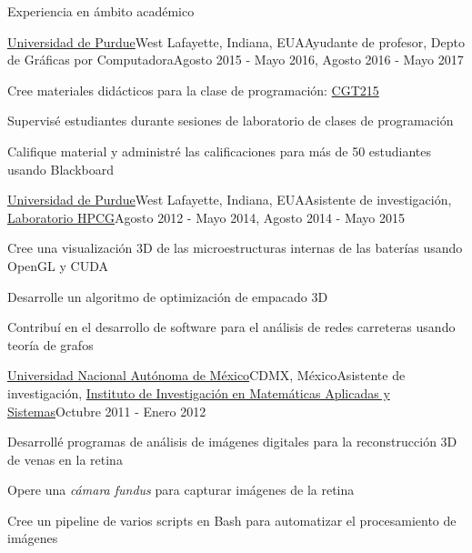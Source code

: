 \documentclass{resume} %
\begin{document}
\begin{rSection}{Experiencia en ámbito académico}

	\begin{rSubsection}{\href{http://www.purdue.edu}{Universidad de Purdue}}{West Lafayette, Indiana, EUA}{Ayudante de profesor, Depto de Gráficas por Computadora}{Agosto 2015 - Mayo 2016, Agosto 2016 - Mayo 2017}
	\item Cree materiales didácticos para la clase de programación: \href{https://polytechnic.purdue.edu/sites/default/files/CGT-fall-2017.pdf}{CGT215}
	\item Supervisé estudiantes durante sesiones de laboratorio de clases de programación
	\item Califique material y administré las calificaciones para más de 50 estudiantes usando Blackboard
	\end{rSubsection}

	\begin{rSubsection}{\href{http://www.purdue.edu}{Universidad de Purdue}}{West Lafayette, Indiana, EUA}{Asistente de investigación, \href{http://hpcg.purdue.edu/}{Laboratorio HPCG}}{Agosto 2012 - Mayo 2014, Agosto 2014 - Mayo 2015}
	\item Cree una visualización 3D de las microestructuras internas de las baterías usando OpenGL y CUDA
	\item Desarrolle un algoritmo de optimización de empacado 3D
	\item Contribuí en el desarrollo de software para el análisis de redes carreteras usando teoría de grafos
	\end{rSubsection}
	
	\begin{rSubsection}{\href{http://www.unam.mx}{Universidad Nacional Autónoma de México}}{CDMX, México}{Asistente de investigación, \href{https://turing.iimas.unam.mx/}{Instituto de Investigación en Matemáticas Aplicadas y Sistemas}}{Octubre 2011 - Enero 2012}
	\item Desarrollé programas de análisis de imágenes digitales para la reconstrucción 3D de venas en la retina
	\item Opere una \emph{cámara fundus} para capturar imágenes de la retina
	\item Cree un pipeline de varios scripts en Bash para automatizar el procesamiento de imágenes
	\end{rSubsection}
	

\end{rSection}
\end{document}
